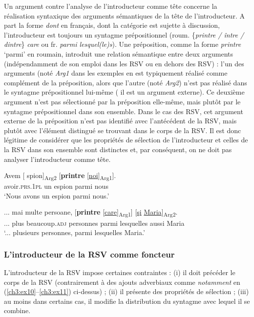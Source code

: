 Un argument contre l’analyse de l’introducteur comme tête concerne la réalisation syntaxique des arguments sémantiques de la tête de l’introducteur. A part la forme \textit{dont} en français, dont la catégorie est sujette à discussion, l’introducteur est toujours un syntagme prépositionnel (roum. \{\textit{printre / între / dintre}\} \textit{care} ou fr. \textit{parmi lesquel(le)s}). Une préposition, comme la forme \textit{printre} ‘parmi’ en roumain, introduit une relation sémantique entre deux arguments (indépendamment de son emploi dans les RSV ou en dehors des RSV) : l’un des arguments (noté \textit{Arg1} dans les exemples en  est typiquement réalisé comme complément de la préposition, alors que l’autre (noté \textit{Arg2}) n’est pas réalisé dans le syntagme prépositionnel lui-même ({\cad} il est un argument externe). Ce deuxième argument n’est pas sélectionné par la préposition elle-même, mais plutôt par le syntagme prépositionnel dans son ensemble. Dans le cas des RSV, cet argument externe de la préposition n’est pas identifié avec l’antécédent de la RSV, mais plutôt avec l’élément distingué se trouvant dans le corps de la RSV. Il est donc légitime de considérer que les propriétés de sélection de l’introducteur et celles de la RSV dans son ensemble sont distinctes et, par conséquent, on ne doit pas analyser l’introducteur comme tête.  


\ea \label{ch3:ex129}
 
\ea
\gll Avem  [  spion]\textsubscript{Arg2}  [\textbf{printre}  [\uline{noi}]\textsubscript{Arg1}]. \label{ch3:ex129a}\\
avoir.\textsc{prs.1pl}  un  espion  parmi  nous \\
\glt ‘Nous avons un espion parmi nous.’

\ex 
\gll ... mai  multe  persoane,  [\textbf{printre}  [\uline{care}]\textsubscript{Arg1}]  [\uline{şi} \uline{Maria}]\textsubscript{Arg2}. \label{ch3:ex129b}\\
 ... plus  beaucoup.\textsc{adj}  personnes  parmi  lesquelles  aussi  Maria\\
\glt ‘... plusieurs personnes, parmi lesquelles Maria.’
\z 
\z


\subsubsection{L’introducteur de la RSV comme foncteur}\label{ch3:sect3.5.3.2}

L’introducteur de la RSV impose certaines contraintes : (i) il doit précéder le corps de la RSV (contrairement à des ajouts adverbiaux comme \textit{notamment} en (\ref{ch3:ex10}--\ref{ch3:ex11}) ci-dessus) ; (ii) il présente des propriétés de sélection ; (iii) au moins dans certains cas, il modifie la distribution du syntagme avec lequel il se combine.

